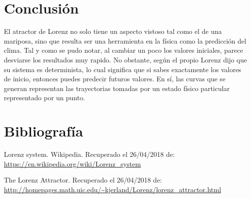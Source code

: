 \documentclass[a4paper]{article}
\begin{document}
\section{Conclusión}

El atractor de Lorenz no solo tiene un aspecto vistoso tal como el de una mariposa, sino que resulta ser una herramienta en la física como la predicción del clima. Tal y como se pudo notar,  al cambiar un poco los valores iniciales, parece desviarse los resultados muy rapido. No obstante, según el propio Lorenz dijo que su sistema es determinista, lo cual significa que si sabes exactamente los valores de inicio, entonces puedes predecir futuros valores. En sí, las curvas que se generan representan las trayectorias tomadas por un estado físico particular representado por un punto.




\section{Bibliografía}

Lorenz system. Wikipedia. Recuperado el 26/04/2018 de: \url{https://en.wikipedia.org/wiki/Lorenz_system}

The Lorenz Attractor. Recuperado el 26/04/2018 de: \url{http://homepages.math.uic.edu/~kjerland/Lorenz/lorenz_attractor.html}
\end{document}
